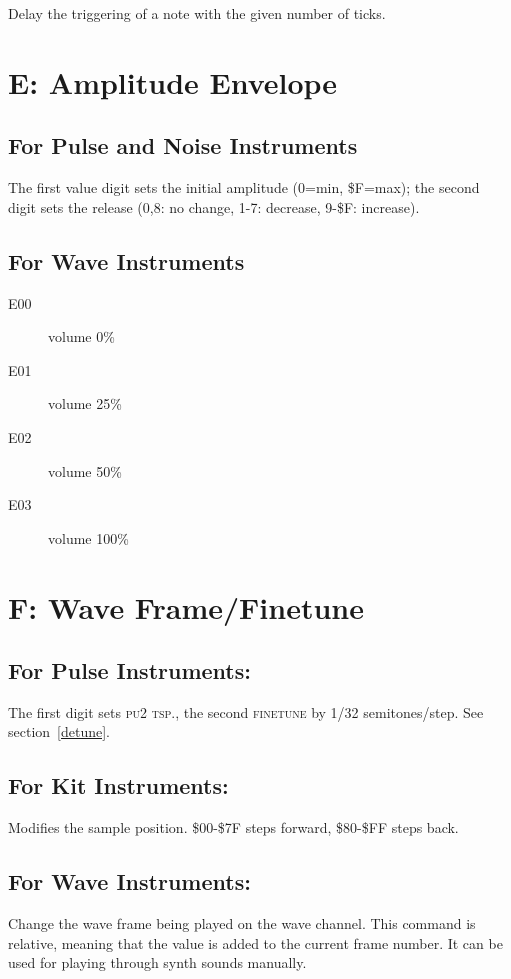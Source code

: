 Delay the triggering of a note with the given number of ticks.

\section{E: Amplitude Envelope}

\subsection{For Pulse and Noise Instruments}
The first value digit sets the initial amplitude (0=min, \$F=max); the second digit sets the release (0,8: no change, 1-7: decrease, 9-\$F: increase).

\subsection{For Wave Instruments}
\begin{description}
\item[E00] volume 0\%
\item[E01] volume 25\%
\item[E02] volume 50\%
\item[E03] volume 100\%
\end{description}

\section{F: Wave Frame/Finetune}

\subsection{For Pulse Instruments:}
The first digit sets \textsc{pu2 tsp.}, the second \textsc{finetune} by 1/32 semitones/step.
See section~\ref{detune}.

\subsection{For Kit Instruments:}
Modifies the sample position. \$00-\$7F steps forward, \$80-\$FF steps back.

\subsection{For Wave Instruments:}
Change the wave frame being played on the wave channel. This command is relative, meaning that the value is added to the current frame number. It can be used for playing through synth sounds manually.

